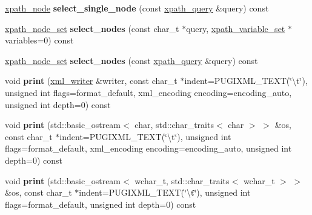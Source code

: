 \begin{DoxyCompactItemize}
\item 
\hypertarget{classpugi_1_1xml__node_a94b942e9f4438836b62d260ee65ab43f}{\hyperlink{classpugi_1_1xpath__node}{xpath\-\_\-node} {\bfseries select\-\_\-single\-\_\-node} (const \hyperlink{classpugi_1_1xpath__query}{xpath\-\_\-query} \&query) const }\label{classpugi_1_1xml__node_a94b942e9f4438836b62d260ee65ab43f}

\item 
\hypertarget{classpugi_1_1xml__node_a32ade4ad1281495923687321825dbb1b}{\hyperlink{classpugi_1_1xpath__node__set}{xpath\-\_\-node\-\_\-set} {\bfseries select\-\_\-nodes} (const char\-\_\-t $\ast$query, \hyperlink{classpugi_1_1xpath__variable__set}{xpath\-\_\-variable\-\_\-set} $\ast$variables=0) const }\label{classpugi_1_1xml__node_a32ade4ad1281495923687321825dbb1b}

\item 
\hypertarget{classpugi_1_1xml__node_acc6e39ed181fac7f56e69280ad51fac6}{\hyperlink{classpugi_1_1xpath__node__set}{xpath\-\_\-node\-\_\-set} {\bfseries select\-\_\-nodes} (const \hyperlink{classpugi_1_1xpath__query}{xpath\-\_\-query} \&query) const }\label{classpugi_1_1xml__node_acc6e39ed181fac7f56e69280ad51fac6}

\item 
\hypertarget{classpugi_1_1xml__node_aed2c5f51a149e116cfe7970c6a5df749}{void {\bfseries print} (\hyperlink{classpugi_1_1xml__writer}{xml\-\_\-writer} \&writer, const char\-\_\-t $\ast$indent=P\-U\-G\-I\-X\-M\-L\-\_\-\-T\-E\-X\-T(\char`\"{}\textbackslash{}t\char`\"{}), unsigned int flags=format\-\_\-default, xml\-\_\-encoding encoding=encoding\-\_\-auto, unsigned int depth=0) const }\label{classpugi_1_1xml__node_aed2c5f51a149e116cfe7970c6a5df749}

\item 
\hypertarget{classpugi_1_1xml__node_a930c02bae5ea9cc206ba358eaff96238}{void {\bfseries print} (std\-::basic\-\_\-ostream$<$ char, std\-::char\-\_\-traits$<$ char $>$ $>$ \&os, const char\-\_\-t $\ast$indent=P\-U\-G\-I\-X\-M\-L\-\_\-\-T\-E\-X\-T(\char`\"{}\textbackslash{}t\char`\"{}), unsigned int flags=format\-\_\-default, xml\-\_\-encoding encoding=encoding\-\_\-auto, unsigned int depth=0) const }\label{classpugi_1_1xml__node_a930c02bae5ea9cc206ba358eaff96238}

\item 
\hypertarget{classpugi_1_1xml__node_a59a563de9fb47e3916f35f14a77d19a9}{void {\bfseries print} (std\-::basic\-\_\-ostream$<$ wchar\-\_\-t, std\-::char\-\_\-traits$<$ wchar\-\_\-t $>$ $>$ \&os, const char\-\_\-t $\ast$indent=P\-U\-G\-I\-X\-M\-L\-\_\-\-T\-E\-X\-T(\char`\"{}\textbackslash{}t\char`\"{}), unsigned int flags=format\-\_\-default, unsigned int depth=0) const }\label{classpugi_1_1xml__node_a59a563de9fb47e3916f35f14a77d19a9}


\end{DoxyCompactItemize}

